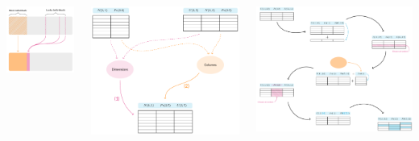\documentclass{beamer}
\begin{document}
\begin{columns}
    \begin{column}{0.3\textwidth}
        \centering%
        \includegraphics[width=.7\linewidth]{tex/selection.pdf}
    \end{column}
    \begin{column}{0.3\textwidth}
        \centering%
        \includegraphics[width=.8\linewidth]{tex/crossover.pdf}
    \end{column}
    \begin{column}{0.3\textwidth}
        \centering%
        \includegraphics[width=.9\linewidth]{tex/mutation.pdf}

\end{column}
\end{columns}
\end{document}
